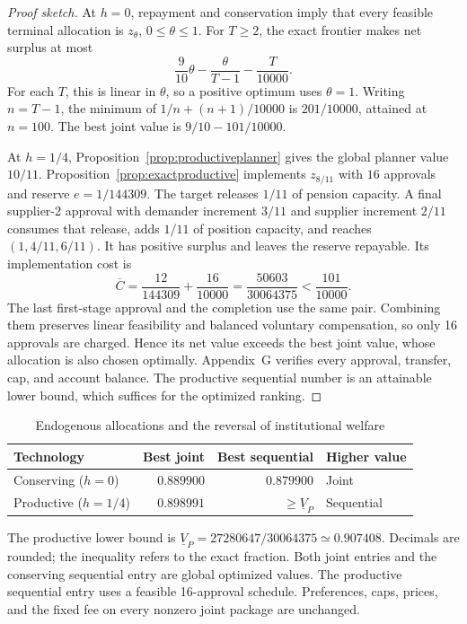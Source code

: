 \documentclass[ecta,draft]{econsocart}
\theoremstyle{definition}
\theoremstyle{definition}
\begin{document}
\begin{proof}[Proof sketch]
At $h=0$, repayment and conservation imply that every feasible terminal
allocation is $z_\theta$, $0\leq\theta\leq1$. For $T\geq2$, the exact
frontier makes net surplus at most
\[
 \frac9{10}\theta-\frac{\theta}{T-1}-\frac{T}{10000}.
\]
For each $T$, this is linear in $\theta$, so a positive optimum uses
$\theta=1$. Writing $n=T-1$, the minimum of
$1/n+(n+1)/10000$ is $201/10000$, attained at $n=100$.
The best joint value is $9/10-101/10000$.

At $h=1/4$, Proposition~\ref{prop:productiveplanner} gives the global planner
value $10/11$. Proposition~\ref{prop:exactproductive} implements
$z_{8/11}$ with $16$ approvals and reserve $e=1/144309$. The target releases
$1/11$ of pension capacity. A final supplier-2 approval with demander increment
$3/11$ and supplier increment $2/11$ consumes that release, adds $1/11$ of
position capacity, and reaches $(1,4/11,6/11)$. It has positive surplus and
leaves the reserve repayable. Its implementation cost is
\[
 \overline C=\frac{12}{144309}+\frac{16}{10000}
            =\frac{50603}{30064375}<\frac{101}{10000}.
\]
The last first-stage approval and the completion use the same pair.
Combining them preserves linear feasibility and balanced voluntary compensation,
so only 16 approvals are charged. Hence its net value exceeds the best joint value, whose allocation is also
chosen optimally. Appendix~G%
 verifies every approval,
transfer, cap, and account balance. The productive sequential number is an
attainable lower bound, which suffices for the optimized ranking.
\end{proof}

\begin{table}[!htbp]
\centering
\caption{Endogenous allocations and the reversal of institutional welfare}
\label{tab:endogenousreversal}\label{tab:productivereversal}
\begin{tabularx}{\linewidth}{@{}>{\raggedright\arraybackslash}Xrrl@{}}
\toprule
Technology & Best joint & Best sequential & Higher value\\
\midrule
Conserving ($h=0$) & $0.889900$ & $0.879900$ & Joint\\
Productive ($h=1/4$) & $0.898991$ & $\geq\underline V_P$ & Sequential\\
\bottomrule
\end{tabularx}

\smallskip
\begin{minipage}{\linewidth}
The productive lower bound is
$\underline V_P=27280647/30064375\simeq0.907408$.
Decimals are rounded; the inequality refers to the exact fraction.
Both joint entries and the conserving sequential entry are global optimized
values. The productive sequential entry uses a feasible 16-approval schedule.
Preferences, caps, prices, and the fixed fee on every nonzero joint package
are unchanged.
\end{minipage}
\end{table}
\end{document}
